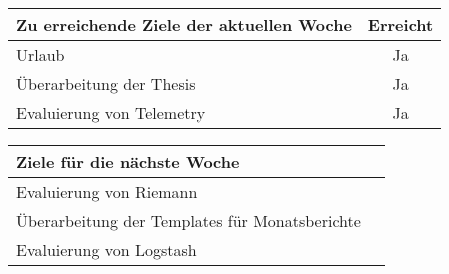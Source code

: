 \begin{tabularx}{\textwidth}{Xc}
    \arrayrulecolor{OliveGreen}
    \toprule
    {\bfseries Zu erreichende Ziele der aktuellen Woche} & {\bfseries Erreicht} \\
    \midrule[2pt]
    Urlaub                                               &Ja                    \\
    \rowcolor{OliveGreen!15}
    Überarbeitung der Thesis                             &Ja                    \\
    \rowcolor{White}
    Evaluierung von Telemetry                            &Ja                    \\
    \bottomrule[2pt]
\end{tabularx}
%
\vspace{1cm}
%
\begin{tabularx}{\textwidth}{Xc}
    \arrayrulecolor{OliveGreen}
    \toprule
    {\bfseries Ziele für die nächste Woche}              &                      \\
    \midrule[2pt]
    Evaluierung von Riemann                              &                      \\
    \rowcolor{OliveGreen!15}
    Überarbeitung der Templates für Monatsberichte       &                      \\
    \rowcolor{White}
    Evaluierung von Logstash                             &                      \\
\end{tabularx}
